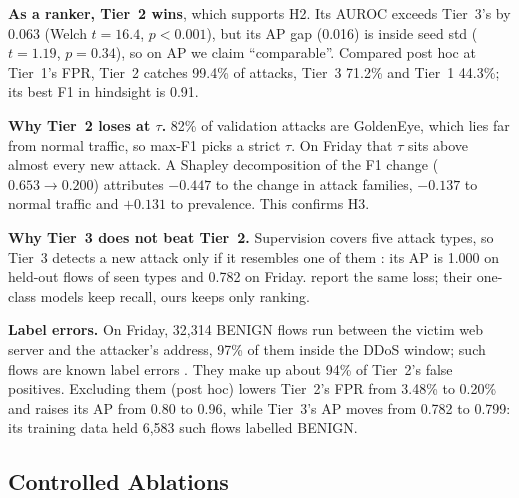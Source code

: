 \documentclass[11pt]{article}
\begin{document}
\textbf{As a ranker, Tier~2 wins}, which supports H2. Its AUROC exceeds Tier~3's by 0.063 (Welch $t=16.4$, $p<0.001$), but its AP gap (0.016) is inside seed std ($t=1.19$, $p=0.34$), so on AP we claim ``comparable''. Compared post hoc at Tier~1's FPR, Tier~2 catches 99.4\% of attacks, Tier~3 71.2\% and Tier~1 44.3\%; its best F1 in hindsight is 0.91.

\textbf{Why Tier~2 loses at $\tau$.} 82\% of validation attacks are GoldenEye, which lies far from normal traffic, so max-F1 picks a strict $\tau$. On Friday that $\tau$ sits above almost every new attack. A Shapley decomposition of the F1 change ($0.653\rightarrow0.200$) attributes $-0.447$ to the change in attack families, $-0.137$ to normal traffic and $+0.131$ to prevalence. This confirms H3.

\textbf{Why Tier~3 does not beat Tier~2.} Supervision covers five attack types, so Tier~3 detects a new attack only if it resembles one of them \citep{sommer2010}: its AP is 1.000 on held-out flows of seen types and 0.782 on Friday. \citet{xu2025} report the same loss; their one-class models keep recall, ours keeps only ranking.

\textbf{Label errors.} On Friday, 32,314 BENIGN flows run between the victim web server and the attacker's address, 97\% of them inside the DDoS window; such flows are known label errors \citep{engelen2021}. They make up about 94\% of Tier~2's false positives. Excluding them (post hoc) lowers Tier~2's FPR from 3.48\% to 0.20\% and raises its AP from 0.80 to 0.96, while Tier~3's AP moves from 0.782 to 0.799: its training data held 6,583 such flows labelled BENIGN.

\subsection{Controlled Ablations}
\label{sec:ablation}
\end{document}

